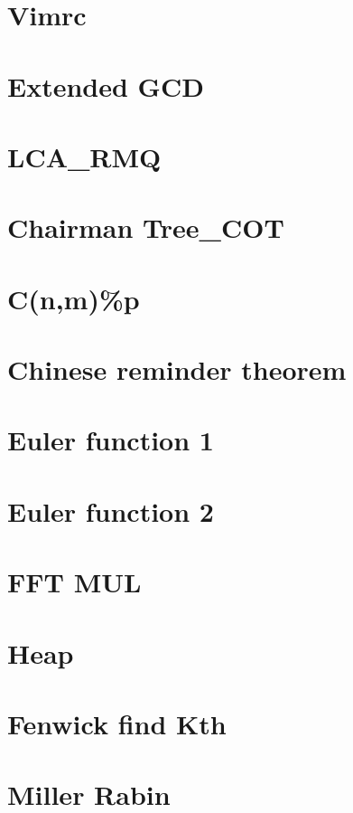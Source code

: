 \documentclass[10pt, a4paper]{article}
\begin{document}
	\section{Vimrc}
	
	\section{Extended GCD}
	
	\section{LCA\_RMQ}
	
	\section{Chairman Tree\_COT}
	
	\section{C(n,m)\%p}
	
	\section{Chinese reminder theorem}
	
	\section{Euler function 1}
	
	\section{Euler function 2}
	
	\section{FFT MUL}
	
	\section{Heap}
	
	\section{Fenwick find Kth}
	
	\section{Miller Rabin}
	
\end{document}
